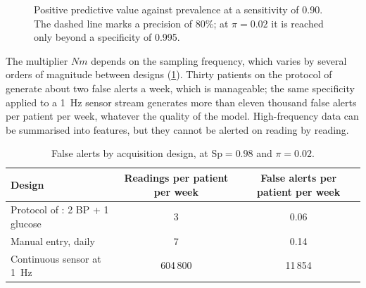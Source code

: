 \begin{figure}[htbp]
\centering
{}
\caption{Positive predictive value against prevalence at a sensitivity of 0.90. The dashed line marks a precision of 80\%; at $\pi = 0.02$ it is reached only beyond a specificity of 0.995.}\label{fig:ppv-prevalence}
\end{figure}

The multiplier $Nm$ depends on the sampling frequency, which varies by several orders of magnitude between designs (\cref{tab:alert-designs}). Thirty patients on the protocol of \textcite{mihevc2025} generate about two false alerts a week, which is manageable; the same specificity applied to a 1~Hz sensor stream generates more than eleven thousand false alerts per patient per week, whatever the quality of the model. High-frequency data can be summarised into features, but they cannot be alerted on reading by reading.

\begin{table}[htbp]
\centering\small
\caption{False alerts by acquisition design, at $\mathrm{Sp} = 0.98$ and $\pi = 0.02$.}\label{tab:alert-designs}
\begin{tabularx}{\textwidth}{@{}X c c@{}}
\toprule
\textbf{Design} & \textbf{Readings per patient per week} & \textbf{False alerts per patient per week} \\
\midrule
Protocol of \textcite{mihevc2025}: 2 BP + 1 glucose & 3 & 0.06 \\
Manual entry, daily & 7 & 0.14 \\
Continuous sensor at 1~Hz \parencite{efendi2025} & 604\,800 & 11\,854 \\
\bottomrule
\end{tabularx}
\end{table}

